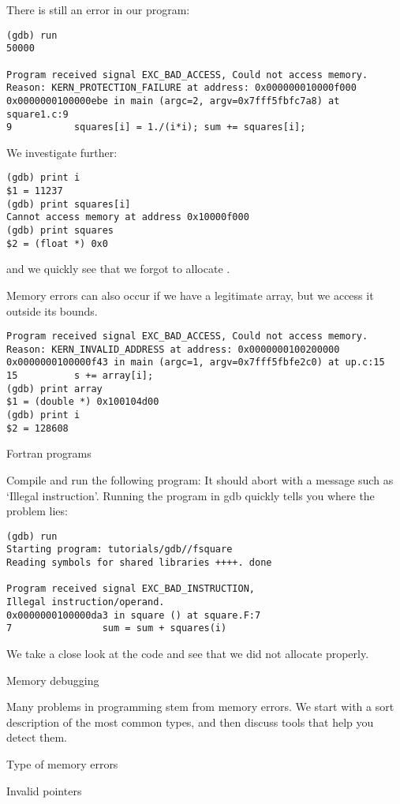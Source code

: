 There is still an error in our program:
{\small
\begin{verbatim}
(gdb) run
50000

Program received signal EXC_BAD_ACCESS, Could not access memory.
Reason: KERN_PROTECTION_FAILURE at address: 0x000000010000f000
0x0000000100000ebe in main (argc=2, argv=0x7fff5fbfc7a8) at square1.c:9
9           squares[i] = 1./(i*i); sum += squares[i];
\end{verbatim}
}
We investigate further:
\begin{verbatim}
(gdb) print i
$1 = 11237
(gdb) print squares[i]
Cannot access memory at address 0x10000f000
(gdb) print squares
$2 = (float *) 0x0
\end{verbatim}
and we quickly see that we forgot to allocate .

Memory errors can also occur if we have a legitimate array, but we access it
outside its bounds.
\begin{verbatim}
Program received signal EXC_BAD_ACCESS, Could not access memory.
Reason: KERN_INVALID_ADDRESS at address: 0x0000000100200000
0x0000000100000f43 in main (argc=1, argv=0x7fff5fbfe2c0) at up.c:15
15          s += array[i];
(gdb) print array
$1 = (double *) 0x100104d00
(gdb) print i
$2 = 128608
\end{verbatim}

 {Fortran programs}

Compile and run the following program:
It should abort with a message such as `Illegal instruction'.
Running the program in gdb quickly tells you where the problem lies:
\begin{verbatim}
(gdb) run
Starting program: tutorials/gdb//fsquare 
Reading symbols for shared libraries ++++. done

Program received signal EXC_BAD_INSTRUCTION,
Illegal instruction/operand.
0x0000000100000da3 in square () at square.F:7
7                sum = sum + squares(i)
\end{verbatim}
We take a close look at the code and see that we did not allocate
 properly.

 {Memory debugging}

Many problems in programming stem from memory errors. We start with a
sort description of the most common types, and then discuss tools that
help you detect them.

 {Type of memory errors}

 {Invalid pointers}

